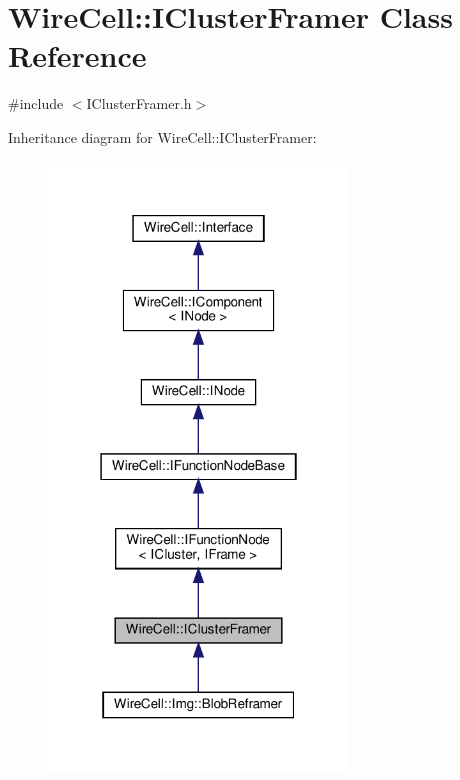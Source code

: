 \hypertarget{class_wire_cell_1_1_i_cluster_framer}{}\section{Wire\+Cell\+:\+:I\+Cluster\+Framer Class Reference}
\label{class_wire_cell_1_1_i_cluster_framer}


{\ttfamily \#include $<$I\+Cluster\+Framer.\+h$>$}



Inheritance diagram for Wire\+Cell\+:\+:I\+Cluster\+Framer\+:
\nopagebreak
\begin{figure}[H]
\begin{center}
\leavevmode
\includegraphics[width=226pt]{class_wire_cell_1_1_i_cluster_framer__inherit__graph}
\end{center}
\end{figure}


